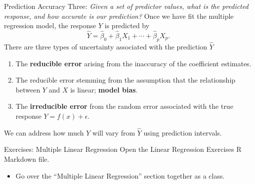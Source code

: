 \documentclass[
  ignorenonframetext,
  aspectratio=169,
]{beamer}
\providecommand{\tightlist}{%
  \setlength{\itemsep}{0pt}\setlength{\parskip}{0pt}}\usepackage{longtable,booktabs,array}
\begin{document}
\begin{frame}{Prediction Accuracy}
\protect\hypertarget{prediction-accuracy}{}
Three: \emph{Given a set of predictor values, what is the predicted
response, and how accurate is our prediction?} Once we have fit the
multiple regression model, the response \(Y\) is predicted by \[
        \hat Y = \hat{\beta}_{0}+\hat{\beta}_{1} X_{1}+\cdots+\hat{\beta}_{p} X_{p}.
        \] There are three types of uncertainty associated with the
prediction \(\hat Y\)

\begin{enumerate}
\item
  The \textbf{reducible error} arising from the inaccuracy of the
  coefficient estimates.
\item
  The reducible error stemming from the assumption that the relationship
  between \(Y\) and \(X\) is linear; \textbf{model bias}.
\item
  The \textbf{irreducible error} from the random error associated with
  the true response \(Y = f(x) + \epsilon\).
\end{enumerate}

We can address how much \(Y\) will vary from \(\hat Y\) using prediction
intervals.
\end{frame}

\begin{frame}{Exercises: Multiple Linear Regression}
\protect\hypertarget{exercises-multiple-linear-regression}{}
Open the Linear Regression Exercises R Markdown file.

\begin{itemize}
\tightlist
\item
  Go over the ``Multiple Linear Regression'' section together as a
  class.
\end{itemize}
\end{frame}
\end{document}
